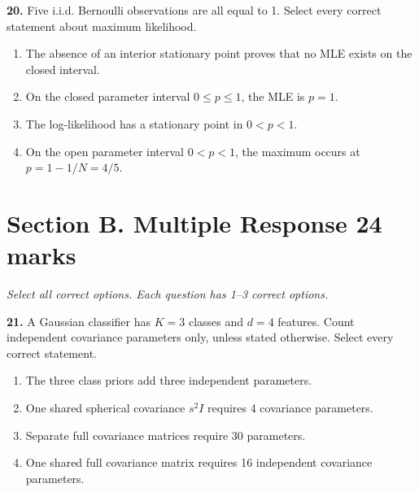 \documentclass[11pt,a4paper]{article}
\begin{document}
\par\noindent\begin{minipage}{\linewidth}
\textbf{20.} Five i.i.d. Bernoulli observations are all equal to 1. Select every correct statement about maximum likelihood.
\begin{enumerate}[label=(\Alph*),leftmargin=8mm,itemsep=2pt,topsep=2pt]
\item The absence of an interior stationary point proves that no MLE exists on the closed interval.
\item On the closed parameter interval \(0\le p\le1\), the MLE is \(p=1\).
\item The log-likelihood has a stationary point in \(0<p<1\).
\item On the open parameter interval \(0<p<1\), the maximum occurs at \(p=1-1/N=4/5\).
\end{enumerate}

\end{minipage}\par\vspace{3mm}
\newpage\section*{Section B. Multiple Response \hfill 24 marks}
\textit{Select all correct options. Each question has 1--3 correct options.}\par
\par\noindent\begin{minipage}{\linewidth}
\textbf{21.} A Gaussian classifier has \(K=3\) classes and \(d=4\) features. Count independent covariance parameters only, unless stated otherwise. Select every correct statement.
\begin{enumerate}[label=(\Alph*),leftmargin=8mm,itemsep=2pt,topsep=2pt]
\item The three class priors add three independent parameters.
\item One shared spherical covariance \(s^2I\) requires 4 covariance parameters.
\item Separate full covariance matrices require 30 parameters.
\item One shared full covariance matrix requires 16 independent covariance parameters.
\end{enumerate}

\end{minipage}\par\vspace{3mm}
\end{document}
